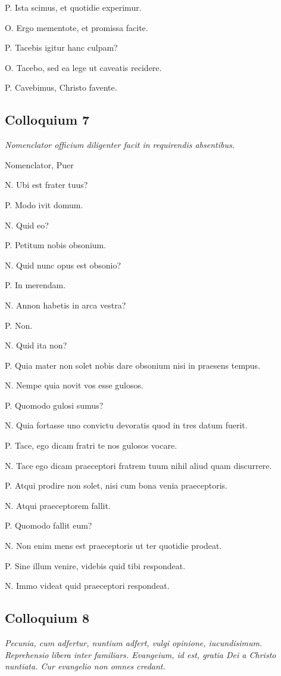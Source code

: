 \documentclass{article}
\begin{document}
P. Ista scimus, et quotidie experimur.

O. Ergo mementote, et promissa facite.

P. Tacebis igitur hanc culpam?

O. Tacebo, sed ea lege ut caveatis recidere. 

P. Cavebimus, Christo favente. 

\subsection{Colloquium 7}
\emph{Nomenclator officium diligenter facit in requirendis absentibus.}

Nomenclator, Puer

N. Ubi est frater tuus?

P. Modo ivit domum.

N. Quid eo?

P. Petitum nobis obsonium. 

N. Quid nunc opus est obsonio?

P. In merendam.
 
N. Annon habetis in arca vestra?

P. Non. 

N. Quid ita non?

P. Quia mater non solet nobis dare obsonium nisi in praesens tempus.

N. Nempe quia novit vos esse gulosos. 

P. Quomodo gulosi sumus?

N. Quia fortasse uno convictu devoratis quod in tres datum fuerit.

P. Tace, ego dicam fratri te nos gulosos vocare.

N. Tace ego dicam praeceptori fratrem tuum nihil aliud quam discurrere. 

P. Atqui prodire non solet, nisi cum bona venia praeceptoris. 

N. Atqui praeceptorem fallit. 

P. Quomodo fallit eum?

N. Non enim mens est praeceptoris ut ter quotidie prodeat. 

P. Sine illum venire, videbis quid tibi respondeat. 

N. Immo videat quid praeceptori respondeat. 

\subsection{Colloquium 8}
\emph{Pecunia, cum adfertur, nuntium adfert, vulgi opinione, iucundisimum. Reprehensio libera inter familiars. Evangeium, id est, gratia Dei a Christo nuntiata. Cur evangelio non omnes credant.}
\end{document}
